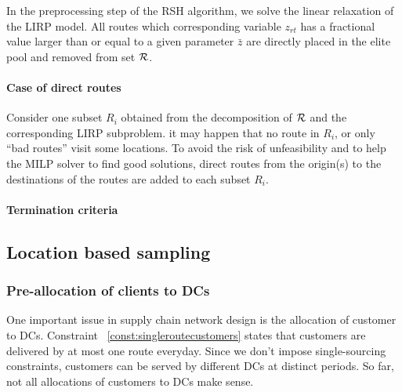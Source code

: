 \documentclass[a4paper,10pt]{article}
\begin{document}
\begin{linenumbers}
	In the preprocessing step of the RSH algorithm, we solve the linear relaxation of the LIRP model. All routes which corresponding variable $z_{rt}$ has a fractional value larger than or equal to a given parameter $\bar{z}$  are directly placed in the elite pool and removed from set $\mathcal{R}$.
	
	
\paragraph{Case of direct routes}

	Consider one subset $R_i$ obtained from the decomposition of $\mathcal{R}$ and the corresponding LIRP subproblem. it may happen that no route in $R_i$, or only ``bad routes'' visit some locations. To avoid the risk of unfeasibility and to help the MILP solver to find good solutions, direct routes from the origin(s) to the destinations of the routes are added to each subset $R_i$. 
	


\paragraph {Termination criteria}



\subsection{Location based sampling}




\subsubsection{Pre-allocation of clients to DCs}

One important issue in supply chain network design is the allocation of customer to DCs. 
Constraint ~\eqref{const:singleroutecustomers} states that customers are delivered by at most one route everyday. 
Since we don't impose single-sourcing constraints, customers can be served by different DCs at distinct periods. 
So far, not all allocations of customers to DCs make sense. 


\end{linenumbers}
\end{document}
